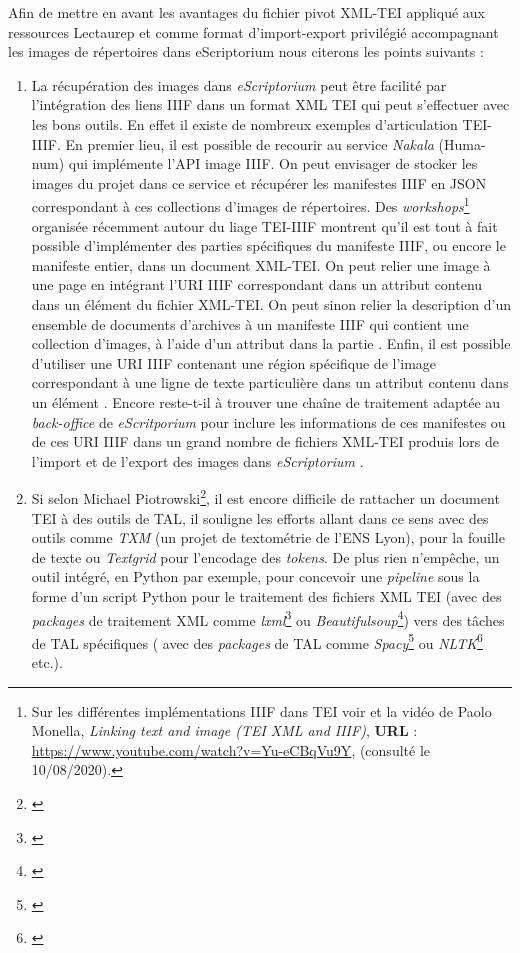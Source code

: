 Afin de mettre en avant les avantages du fichier pivot XML-TEI appliqué aux ressources Lectaurep et comme format d'import-export privilégié accompagnant les images de répertoires dans eScriptorium nous citerons les points suivants :\\
\begin{enumerate}
    \item La récupération des images dans \textit{eScriptorium} peut être facilité par l'intégration des liens IIIF dans un format XML TEI qui peut s'effectuer avec les bons outils. En effet il existe de nombreux exemples d'articulation TEI-IIIF. En premier lieu, il est possible de recourir au service \textit{Nakala} (Huma-num) qui implémente l'API image IIIF. On peut envisager de stocker les images du projet dans ce service et récupérer les manifestes IIIF en JSON correspondant à ces collections d'images de répertoires. Des \textit{workshops}\footnote{Sur les différentes implémentations IIIF dans TEI voir \cite{monella_linking_2019} et la vidéo de Paolo Monella, \textit{Linking text and image (TEI XML and IIIF)}, \textbf{URL} : \url{https://www.youtube.com/watch?v=Yu-eCBqVu9Y}, (consulté le 10/08/2020).} organisée récemment autour du liage TEI-IIIF montrent qu'il est tout à fait possible d'implémenter des parties spécifiques du manifeste IIIF, ou encore le manifeste entier, dans un document XML-TEI. On peut relier une image à une page en intégrant l'URI IIIF correspondant dans un attribut  contenu dans un élément  du fichier XML-TEI. On peut sinon relier la description d'un ensemble de documents d'archives à un manifeste IIIF qui contient une collection d'images, à l'aide d'un attribut  dans la partie . Enfin, il est possible d'utiliser une URI IIIF contenant une région spécifique de l'image correspondant à une ligne de texte particulière dans un attribut  contenu dans un élément . Encore reste-t-il à trouver une chaîne de traitement adaptée au \textit{back-office} de \textit{eScritporium} pour inclure les informations de ces manifestes ou de ces URI IIIF dans un grand nombre de fichiers XML-TEI produis lors de l'import et de l'export des images dans \textit{eScriptorium} .
    \item Si selon Michael Piotrowski\footnote{\cite{romary_natural_2014}}, il est encore difficile de rattacher un document TEI à des outils de TAL, il souligne les efforts allant dans ce sens avec des outils comme \textit{TXM} (un projet de textométrie de l'ENS Lyon), pour la fouille de texte ou \textit{Textgrid} pour l'encodage des \textit{tokens}. De plus rien n'empêche, un outil intégré, en Python par exemple, pour concevoir une \textit{pipeline} sous la forme d'un script Python pour le traitement des fichiers XML TEI (avec des \textit{packages} de traitement XML comme \textit{lxml}\footnote{\cite{noauthor_lxml_nodate}} ou \textit{Beautifulsoup}\footnote{\cite{noauthor_bs4_nodate}}) vers des tâches de TAL spécifiques ( avec des \textit{packages} de TAL comme \textit{Spacy}\footnote{\cite{noauthor_spacy_nodate}} ou \textit{NLTK}\footnote{\cite{noauthor_nltk_nodate}} etc.).

\end{enumerate}
